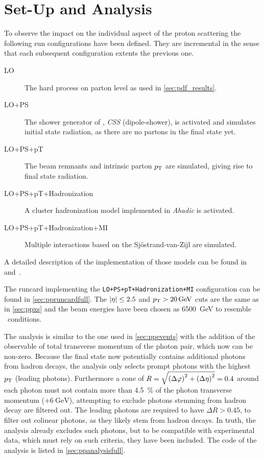 \section{Set-Up and Analysis}%
\label{sec:setupan}

To observe the impact on the individual aspect of the proton
scattering the following run configurations have been defined. They
are incremental in the sense that each subsequent configuration
extents the previous one.
%
\begin{description}
\item[LO] The hard process on parton level as used in \cref{sec:pdf_results}.
\item[LO+PS] The shower generator of \sherpa, \emph{CSS} (dipole-shower),
  is activated and simulates initial state radiation, as there are no
  partons in the final state yet.
\item[LO+PS+pT] The beam remnants and intrinsic parton
  \(p_\mathrm{T}\) are simulated, giving rise to final state radiation.
\item[LO+PS+pT+Hadronization] A cluster hadronization model
  implemented in \emph{Ahadic} is activated.
\item[LO+PS+pT+Hadronization+MI] Multiple interactions based on the
  Sj\"ostrand-van-Zijl are simulated.
\end{description}
%
A detailed description of the implementation of those models can be
found in~\cite{Gleisberg:2008ta} and~\cite{Bothmann:2019yzt}.

The runcard implementing the \texttt{LO+PS+pT+Hadronization+MI}
configuration can be found in \cref{sec:ppruncardfull}. The
\(\abs{\eta}\leq 2.5\) and \(p_\mathrm{T} > \SI{20}{\giga\electronvolt}\) cuts are
the same as in \cref{sec:ppxs} and the beam energies have been chosen
as \SI{6500}{\giga\electronvolt} to resemble \lhc\ conditions.

The analysis is similar to the one used in \cref{sec:ppevents} with
the addition of the observable of total transverse momentum of the
photon pair, which now can be non-zero. Because the final state now
potentially contains additional photons from hadron decays, the
analysis only selects prompt photons with the highest \(p_\mathrm{T}\) (leading
photons). Furthermore a cone of
\(R = \sqrt{\qty(\Delta\varphi)^2 + \qty(\Delta\eta)^2} = 0.4\) around
each photon must not contain more than \SI{4.5}{\percent} of the
photon transverse momentum (\(+ \SI{6}{\giga\electronvolt}\)),
attempting to exclude photons stemming from hadron decay are filtered
out. The leading photons are required to have \(\Delta R > 0.45\), to
filter out colinear photons, as they likely stem from hadron
decays. In truth, the analysis already excludes such photons, but to
be compatible with experimental data, which must rely on such
criteria, they have been included. The code of the analysis is listed
in \cref{sec:ppanalysisfull}.


